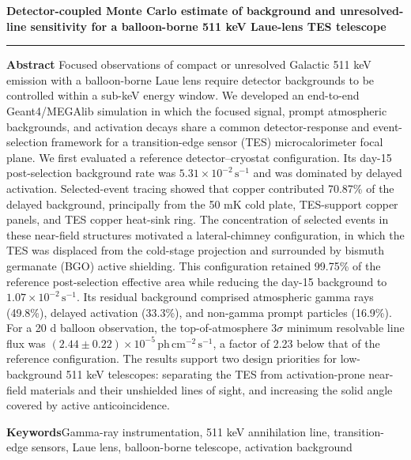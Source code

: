 \documentclass[11pt]{article}
\newcommand{\phcms}{\ensuremath{\,\mathrm{ph\,cm^{-2}\,s^{-1}}}}
\newcommand{\cps}{\ensuremath{\,\mathrm{s^{-1}}}}
\begin{document}
\thispagestyle{fancy}
\begin{flushleft}
{\LARGE\bfseries Detector-coupled Monte Carlo estimate of background and unresolved-line sensitivity for a balloon-borne 511 keV Laue-lens TES telescope\par}
\end{flushleft}
\vspace{0.7em}
\noindent\rule{\textwidth}{0.4pt}
\vspace{0.5em}

\noindent\textbf{Abstract}\hspace{0.7em}
Focused observations of compact or unresolved Galactic 511 keV emission with a
balloon-borne Laue lens require detector backgrounds to be controlled within a
sub-keV energy window. We developed an end-to-end Geant4/MEGAlib simulation in
which the focused signal, prompt atmospheric backgrounds, and activation decays
share a common detector-response and event-selection framework for a
transition-edge sensor (TES) microcalorimeter focal plane. We first evaluated a
reference detector--cryostat configuration. Its day-15 post-selection
background rate was $5.31\times10^{-2}\cps$ and was dominated by delayed
activation. Selected-event tracing showed that copper contributed 70.87\% of
the delayed background, principally from the 50 mK cold plate, TES-support
copper panels, and TES copper heat-sink ring. The concentration of selected
events in these near-field structures motivated a lateral-chimney
configuration, in which the TES was displaced from the
cold-stage projection and surrounded by bismuth germanate (BGO) active
shielding. This configuration retained 99.75\% of the reference post-selection
effective area while reducing the day-15 background to
$1.07\times10^{-2}\cps$. Its residual background comprised atmospheric
gamma rays (49.8\%), delayed activation (33.3\%), and non-gamma
prompt particles (16.9\%). For a 20 d balloon observation, the top-of-atmosphere
$3\sigma$ minimum resolvable line flux was
$(2.44\pm0.22)\times10^{-5}\phcms$, a factor of 2.23 below that of the reference
configuration. The results support two design priorities for low-background
511 keV telescopes: separating the TES from activation-prone near-field
materials and their unshielded lines of sight, and increasing the solid angle
covered by active anticoincidence.

\vspace{0.7em}
\noindent\textbf{Keywords}\hspace{0.7em}Gamma-ray instrumentation, 511 keV annihilation line, transition-edge sensors, Laue lens, balloon-borne telescope, activation background
\end{document}
